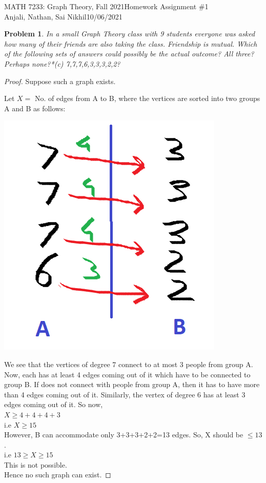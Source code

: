 \documentclass[12pt]{article}
\newtheorem{problem}{Problem}
\begin{document}
\noindent MATH 7233: Graph Theory, Fall 2021\hfill Homework Assignment \#1\\
Anjali, Nathan, Sai Nikhil\hfill 10/06/2021

\hrulefill

\begin{problem}
In a small Graph Theory class with 9 students everyone was asked how many of their friends are also taking the class.  Friendship is mutual.  Which of the following sets of answers could possibly be the actual outcome?  All three?  Perhaps none?*(c)  7,7,7,6,3,3,3,2,2?
\end{problem}

\begin{proof}
Suppose such a graph exists.

Let $X = $ No. of edges from A to B, where the vertices are sorted into two groups A and B as follows:

\begin{center}
\includegraphics[scale=0.75]{WS_1}    
\end{center}

We see that the vertices of degree 7 connect to at most 3 people from group A. Now, each has at least 4 edges coming out of it which have to be connected to group B. If does not connect with people from group A, then it has to have more than 4 edges coming out of it. Similarly, the vertex of degree 6 has at least 3 edges coming out of it.
So now,\\
 $X \geq 4+4+4+3$
\\
i.e $X \geq 15$\\

However, B can accommodate only 3+3+3+2+2=13 edges. So, X should be $\leq 13$.\\
i.e $13 \geq X \geq 15$\\
This is not possible.\\
Hence no such graph can exist.

\end{proof}
\end{document}
